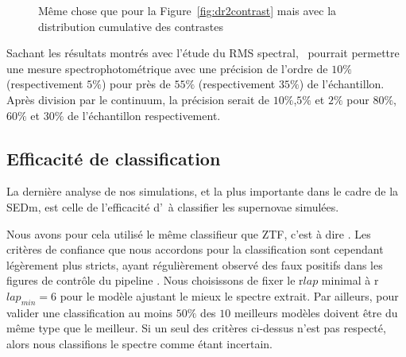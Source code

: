 \documentclass[../main/main.tex]{subfiles}
\begin{document}
\begin{figure}[ht]
  \centering
  \caption[Distribution cumulative du contraste des SNeIa de la DR2 de
  ZTF-Cosmo.]{Même chose que pour la Figure~\ref{fig:dr2contrast} mais
    avec la distribution cumulative des contrastes}
  \label{fig:dr2contrast_cum}
\end{figure}

Sachant les résultats montrés avec l'étude du RMS spectral, \hypergal\
pourrait permettre une mesure spectrophotométrique avec une précision de
l'ordre de $10\%$ (respectivement $5\%$) pour près de $55\%$
(respectivement $35\%$) de l'échantillon.
Après division par le continuum, la précision serait de $10\%$,$5\%$ et $2\%$ pour
$80\%$, $60\%$ et $30\%$ de l'échantillon respectivement.


\subsection{Efficacité de classification}\label{ssec:typingsimu}

La dernière analyse de nos simulations, et la plus importante dans le
cadre de la SEDm, est celle de l'efficacité d'\hypergal\ à classifier
les supernovae simulées.

Nous avons pour cela utilisé le même classifieur que ZTF, c'est à dire
\pkg{SNID}. Les critères de confiance que nous accordons pour la classification
sont cependant légèrement plus stricts, ayant régulièrement observé
des faux positifs dans les figures de contrôle du pipeline \pysedm. Nous
choisissons de fixer le r$lap$ minimal à r$lap_{min}=6$ pour le modèle
ajustant le mieux le spectre extrait. Par ailleurs, pour valider une
classification au moins $50\%$ des $10$ meilleurs modèles doivent être
du même type que le meilleur. Si un seul des critères ci-dessus n'est pas
respecté, alors nous classifions le spectre comme étant incertain.\\
\end{document}
